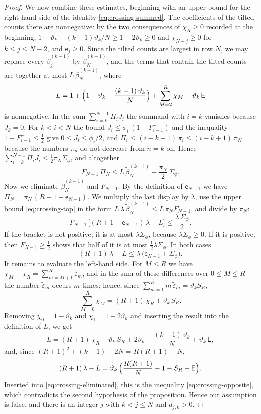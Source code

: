 \documentclass{amsart}
\theoremstyle{definition}
\theoremstyle{remark}
\numberwithin{equation}{section}
\begin{document}
\begin{proof}
We now combine these estimates, beginning with an upper bound for the right-hand side of the identity \eqref{eq:crossing-summed}. The coefficients of the tilted counts there are nonnegative: by the two consequences of $\chi_R\ge 0$ recorded at the beginning, $1-\vartheta_k-(k-1)\vartheta_k/N\ge 1-2\vartheta_k\ge 0$ and $\chi_{N-j}\ge 0$ for $k\le j\le N-2$, and $\mathsf e_j\ge 0$. Since the tilted counts are largest in row $N$, we may replace every $\tilde\beta^{(k-1)}_j$ by $\tilde\beta^{(k-1)}_N$, and the terms that contain the tilted counts are together at most $L\,\tilde\beta^{(k-1)}_N$, where
\[
L=1+\Bigl(1-\vartheta_k-\frac{(k-1)\,\vartheta_k}{N}\Bigr)+\sum_{M=2}^{R}\chi_M+\vartheta_k\,\mathsf E
\]
is nonnegative. In the sum $\sum_{i=k}^{N-1}\Pi_iJ_i$ the summand with $i=k$ vanishes because $J_k=0$. For $k<i<N$ the bound $J_i\le\phi_i\,(1-F^-_{i-1})$ and the inequality $1-F^-_{i-1}\le\frac12$ give $0\le J_i\le\phi_i/2$, and $\Pi_i\le(i-k+1)\,\pi_i\le(i-k+1)\,\pi_N$ because the numbers $\pi_n$ do not decrease from $n=k$ on. Hence $\sum_{i=k}^{N-1}\Pi_iJ_i\le\frac12\pi_N\Sigma_\phi$, and altogether
\[
F_{N-1}\,\Pi_N\le L\,\tilde\beta^{(k-1)}_N+\frac{\pi_N}{2}\,\Sigma_\phi .
\]
Now we eliminate $\tilde\beta^{(k-1)}_N$ and $F_{N-1}$. By the definition of $\mathsf e_{N-1}$ we have $\Pi_N=\pi_N\,(R+1-\mathsf e_{N-1})$. We multiply the last display by $\lambda$, use the upper bound \eqref{eq:crossing-top} in the form $L\,\lambda\,\tilde\beta^{(k-1)}_N\le L\,\pi_NF_{N-1}$, and divide by $\pi_N$:
\[
F_{N-1}\,\bigl[(R+1-\mathsf e_{N-1})\,\lambda-L\bigr]\le\frac{\lambda\,\Sigma_\phi}{2}.
\]
If the bracket is not positive, it is at most $\lambda\Sigma_\phi$, because $\lambda\Sigma_\phi\ge 0$. If it is positive, then $F_{N-1}\ge\frac12$ shows that half of it is at most $\frac12\lambda\Sigma_\phi$. In both cases
\begin{equation}\label{eq:crossing-eliminated}
(R+1)\,\lambda-L\le\lambda\,\bigl(\mathsf e_{N-1}+\Sigma_\phi\bigr).
\end{equation}
It remains to evaluate the left-hand side. For $M\le R$ we have $\chi_M-\chi_R=\sum_{m=M+1}^{R}\tilde\varepsilon_m$, and in the sum of these differences over $0\le M\le R$ the number $\tilde\varepsilon_m$ occurs $m$ times; hence, since $\sum_{m=1}^{R}m\,\tilde\varepsilon_m=\vartheta_kS_R$,
\[
\sum_{M=0}^{R}\chi_M=(R+1)\,\chi_R+\vartheta_k\,S_R .
\]
Removing $\chi_0=1-\vartheta_k$ and $\chi_1=1-2\vartheta_k$ and inserting the result into the definition of $L$, we get
\[
L=(R+1)\,\chi_R+\vartheta_k\,S_R+2\vartheta_k-\frac{(k-1)\,\vartheta_k}{N}+\vartheta_k\,\mathsf E ,
\]
and, since $(R+1)^2+(k-1)-2N=R(R+1)-N$,
\[
(R+1)\,\lambda-L=\vartheta_k\,\Bigl(\frac{R(R+1)}{N}-1-S_R-\mathsf E\Bigr).
\]
Inserted into \eqref{eq:crossing-eliminated}, this is the inequality \eqref{eq:crossing-opposite}, which contradicts the second hypothesis of the proposition. Hence our assumption is false, and there is an integer $j$ with $k<j\le N$ and $d_{j,k}>0$.
\end{proof}
\end{document}
